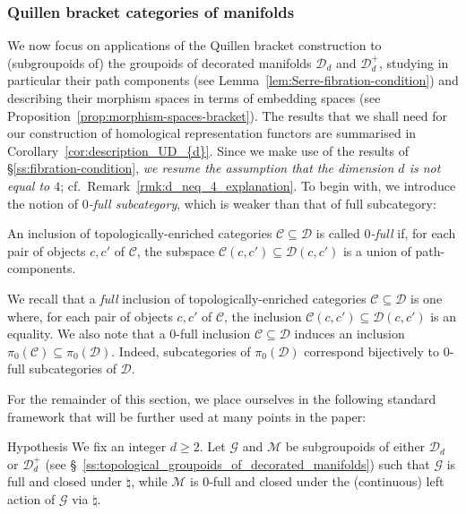 \documentclass[AHL,Unicode,published]{cedram}
\newcommand{\cC}{\mathcal{C}}
\newcommand{\cD}{\mathcal{D}}
\newcommand{\cG}{\mathcal{G}}
\newcommand{\cM}{\mathcal{M}}
\renewcommand{\geq}{\geqslant}
\begin{document}
\subsubsection{Quillen bracket categories of manifolds}\label{sss:quillen-bracket-categories}

We now focus on applications of the Quillen bracket construction to (subgroupoids of) the groupoids of decorated manifolds $\cD_{d}$ and $\cD_{d}^{+}$, studying in particular their path components (see Lemma~\ref{lem:Serre-fibration-condition}) and describing their morphism spaces in terms of embedding spaces (see Proposition~\ref{prop:morphism-spaces-bracket}). The results that we shall need for our construction of homological representation functors are summarised in Corollary~\ref{cor:description_UD_{d}}. Since we make use of the results of \S\ref{ss:fibration-condition}, \emph{we resume the assumption that the dimension $d$ is not equal to $4$}; cf.~Remark~\ref{rmk:d_neq_4_explanation}. To begin with, we introduce the notion of \emph{$0$-full subcategory}, which is weaker than that of full subcategory:

\begin{defi}\label{def:zero-full}
An inclusion of topologically-enriched categories $\cC \subseteq \cD$ is called \emph{$0$-full} if, for each pair of objects $c,c'$ of $\cC$, the subspace $\cC(c,c') \subseteq \cD(c,c')$ is a union of path-components.
\end{defi}

\begin{rema}
We recall that a \emph{full} inclusion of topologically-enriched categories $\cC \subseteq \cD$ is one where, for each pair of objects $c,c'$ of $\cC$, the inclusion $\cC(c,c') \subseteq \cD(c,c')$ is an equality. We also note that a $0$-full inclusion $\cC \subseteq \cD$ induces an inclusion $\pi_{0}(\cC) \subseteq \pi_{0}(\cD)$. Indeed, subcategories of $\pi_{0}(\cD)$ correspond bijectively to $0$-full subcategories of $\cD$.
\end{rema}

For the remainder of this section, we place ourselves in the following standard framework that will be further used at many points in the paper:

\begin{enonce}
{Hypothesis }\label{hypo:standard_framework}
We fix an integer $d \geq 2$. Let $\cG$ and $\cM$ be subgroupoids of either $\cD_{d}$ or $\cD_{d}^{+}$ (see \S~\ref{ss:topological_groupoids_of_decorated_manifolds}) such that $\cG$ is full and closed under $\natural$, while $\cM$ is $0$-full and closed under the (continuous) left action of $\cG$ via $\natural$.
\end{enonce}
\end{document}
